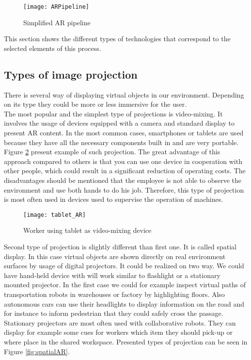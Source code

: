 \documentclass[printmode,en]{mgr}
\begin{document}
\begin{figure}[!ht]
  \centering
    \texttt{[image: ARPipeline]}
  \caption{Simplified AR pipeline \cite{Shipyard}}
  \label{fig:ARpipeline}
\end{figure}

This section shows the different types of technologies that correspond to the selected elements of this process.

\subsection{Types of image projection}
There is several way of displaying virtual objects in our environment. Depending on its type they could be more or less immersive for the user.\\

The most popular and the simplest type of projections is video-mixing. It involves the usage of devices equipped with a camera and standard display to present AR content. In the most common cases, smartphones or tablets are used because they have all the necessary components built in and are very portable. Figure \ref{fig:tabletAR} present example of such projection. The great advantage of this approach compared to others is that you can use one device in cooperation with other people, which could result in a significant reduction of operating costs. The disadvantages should be mentioned that the employee is not able to observe the environment and use both hands to do his job. Therefore, this type of projection is most often used in devices used to supervise the operation of machines.

\begin{figure}[!ht]
  \centering
    \texttt{[image: tablet\_AR]}
  \caption{Worker using tablet as video-mixing device \cite{Shipyard}}
  \label{fig:tabletAR}
\end{figure}

Second type of projection is slightly different than first one. It is called spatial display. In this case virtual objects are shown directly on real environment surfaces by usage of digital projectors. It could be realized on two way. We could have hand-held device with will work similar to flashlight or a stationary mounted projector. In the first case we could for example inspect virtual paths of transportation robots in warehouses or factory by highlighting floors. Also autonomous cars can use their headlights to display information on the road and for instance to inform pedestrian that they could safely cross the passage. Stationary projectors are most often used with collaborative robots. They can display for example some cues for workers which item they should pick-up or where place in the shared workspace. Presented types of projection can be seen in Figure \ref{fig:spatialAR}.
\end{document}
